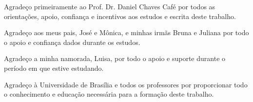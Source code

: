 \begin{agradecimentos}
Agradeço primeiramente ao Prof. Dr. Daniel Chaves Café por todos as orientações, apoio, confiança e incentivos aos estudos e escrita deste trabalho.

Agradeço aos meus pais, José e Mônica, e minhas irmãs Bruna e Juliana por todo o apoio e confiança dados durante os estudos.

Agradeço a minha namorada, Luisa, por todo o apoio e suporte durante o período em que estive estudando. 

Agradeço à Universidade de Brasília e todos os professores por proporcionar todo o conhecimento e educação necessária para a formação deste trabalho.

\end{agradecimentos}
